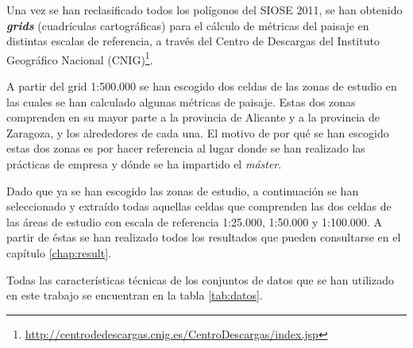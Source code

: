 Una vez se han reclasificado todos los polígonos del SIOSE 2011, se han obtenido \textbf{\textit{grids}} (cuadrículas cartográficas) para el cálculo de métricas del paisaje en distintas escalas de referencia, a través del Centro de Descargas del Instituto Geográfico Nacional (CNIG)\footnote{\url{http://centrodedescargas.cnig.es/CentroDescargas/index.jsp}}. 

A partir del grid 1:500.000 se han escogido dos celdas de las zonas de estudio en las cuales se han calculado algunas métricas de paisaje. Estas dos zonas comprenden en su mayor parte a la provincia de Alicante y a la provincia de Zaragoza, y los alrededores de cada una. El motivo de por qué se han escogido estas dos zonas es por hacer referencia al lugar donde se han realizado las prácticas de empresa y dónde se ha impartido el \textit{máster}.

Dado que ya se han escogido las zonas de estudio, a continuación se han seleccionado y extraído todas aquellas celdas que comprenden las dos celdas de las áreas de estudio con escala de referencia 1:25.000, 1:50.000 y 1:100.000. A partir de éstas se han realizado todos los resultados que pueden consultarse en el capítulo \ref{chap:result}.

Todas las características técnicas de los conjuntos de datos que se han utilizado en este trabajo se encuentran en la tabla \ref{tab:datos}.


